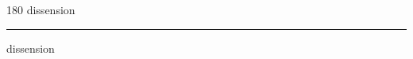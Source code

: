 
\begin{frame}
\begin{center}
\begin{turn}{180}
{\fontsize{2.5cm}{1em}\selectfont dissension}
\end{turn}
\vspace{1em}\par  
\hrule
\vspace{1em}\par  
{\fontsize{2.5cm}{1em}\selectfont dissension}
\end{center}
\end{frame}
